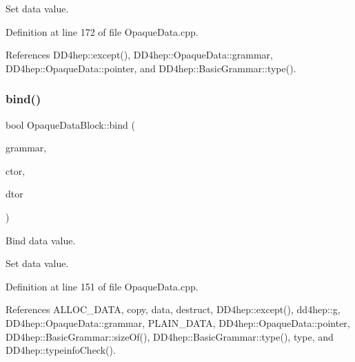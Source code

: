 Set data value. 



Definition at line 172 of file Opaque\+Data.\+cpp.



References D\+D4hep\+::except(), D\+D4hep\+::\+Opaque\+Data\+::grammar, D\+D4hep\+::\+Opaque\+Data\+::pointer, and D\+D4hep\+::\+Basic\+Grammar\+::type().

\hypertarget{class_d_d4hep_1_1_opaque_data_block_a237aa4d85136b95af80cd46be06a1053}{}\label{class_d_d4hep_1_1_opaque_data_block_a237aa4d85136b95af80cd46be06a1053} 
\subsubsection{\texorpdfstring{bind()}{bind()}\hspace{0.1cm}{\footnotesize\ttfamily [1/2]}}
{\footnotesize\ttfamily bool Opaque\+Data\+Block\+::bind (\begin{DoxyParamCaption}\item[{const \hyperlink{class_d_d4hep_1_1_basic_grammar}{Basic\+Grammar} $\ast$}]{grammar,  }\item[{void($\ast$)(void $\ast$, const void $\ast$)}]{ctor,  }\item[{void($\ast$)(void $\ast$)}]{dtor }\end{DoxyParamCaption})}



Bind data value. 

Set data value. 

Definition at line 151 of file Opaque\+Data.\+cpp.



References A\+L\+L\+O\+C\+\_\+\+D\+A\+TA, copy, data, destruct, D\+D4hep\+::except(), dd4hep\+::g, D\+D4hep\+::\+Opaque\+Data\+::grammar, P\+L\+A\+I\+N\+\_\+\+D\+A\+TA, D\+D4hep\+::\+Opaque\+Data\+::pointer, D\+D4hep\+::\+Basic\+Grammar\+::size\+Of(), D\+D4hep\+::\+Basic\+Grammar\+::type(), type, and D\+D4hep\+::typeinfo\+Check().

\hypertarget{class_d_d4hep_1_1_opaque_data_block_a6ed751afee70c1b0ebb8afeed558b96b}{}\label{class_d_d4hep_1_1_opaque_data_block_a6ed751afee70c1b0ebb8afeed558b96b} 
